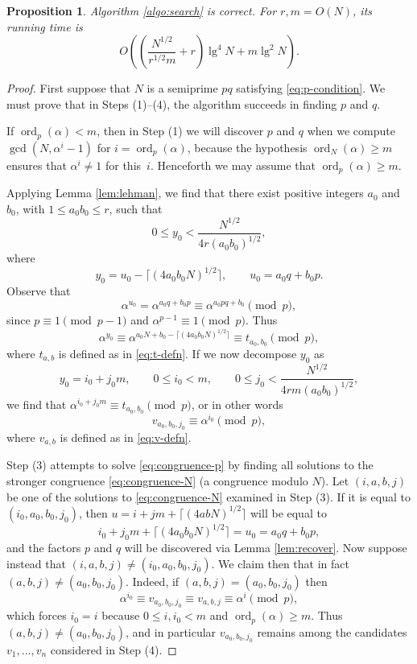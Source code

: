 \documentclass[reqno]{amsart}
\newtheorem{prop}[thm]{Proposition}
\theoremstyle{remark}
\numberwithin{equation}{section}
\numberwithin{thm}{section}
\renewcommand{\leq}{\leqslant}
\renewcommand{\geq}{\geqslant}
\DeclareMathOperator{\ord}{ord}
\begin{document}
\begin{prop}
\label{prop:search}
  Algorithm \ref{algo:search} is correct.
  For $r, m = O(N)$, its running time is
    \[ O\left(\left(\frac{N^{1/2}}{r^{1/2} m} + r\right) \lg^4 N + m \lg^2 N \right). \]
\end{prop}
\begin{proof}
  First suppose that $N$ is a semiprime $pq$ satisfying \eqref{eq:p-condition}.
  We must prove that in Steps (1)--(4),
  the algorithm succeeds in finding $p$ and $q$.

  If $\ord_p(\alpha) < m$,
  then in Step (1) we will discover $p$ and $q$ when we compute
  $\gcd(N, \alpha^i - 1)$ for $i = \ord_p(\alpha)$,
  because the hypothesis $\ord_N(\alpha) \geq m$ ensures that
  $\alpha^i \neq 1$ for this~$i$.
  Henceforth we may assume that $\ord_p(\alpha) \geq m$.

  Applying Lemma \ref{lem:lehman}, we find that there exist positive integers
  $a_0$ and $b_0$, with $1 \leq a_0 b_0 \leq r$, such that
    \[ 0 \leq y_0 < \frac{N^{1/2}}{4r(a_0 b_0)^{1/2}}, \]
  where
    \[ y_0 = u_0 - \lceil (4 a_0 b_0 N)^{1/2} \rceil, \qquad u_0 = a_0 q + b_0 p. \]
  Observe that
    \[ \alpha^{u_0} = \alpha^{a_0 q + b_0 p} \equiv \alpha^{a_0 pq + b_0} \pmod p, \]
  since $p \equiv 1 \pmod{p-1}$ and $\alpha^{p-1} \equiv 1 \pmod p$.
  Thus
    \[ \alpha^{y_0} \equiv \alpha^{a_0 N + b_0 - \lceil (4 a_0 b_0 N)^{1/2} \rceil} \equiv t_{a_0,b_0} \pmod p, \]
  where $t_{a,b}$ is defined as in \eqref{eq:t-defn}.
  If we now decompose $y_0$ as
    \[ y_0 = i_0 + j_0 m, \qquad 0 \leq i_0 < m, \qquad 0 \leq j_0 < \frac{N^{1/2}}{4rm(a_0 b_0)^{1/2}}, \]
  we find that $\alpha^{i_0 + j_0 m} \equiv t_{a_0,b_0} \pmod p$, or in other words
  \begin{equation}
    \label{eq:congruence-p}
    v_{a_0,b_0,j_0} \equiv \alpha^{i_0} \pmod p,
  \end{equation}
  where $v_{a,b}$ is defined as in \eqref{eq:v-defn}.

  Step (3) attempts to solve \eqref{eq:congruence-p} by finding all solutions
  to the stronger congruence \eqref{eq:congruence-N} (a congruence modulo $N$).
  Let $(i,a,b,j)$ be one of the solutions to
  \eqref{eq:congruence-N} examined in Step (3).
  If it is equal to $(i_0,a_0,b_0,j_0)$,
  then $u = i + jm + \lceil (4abN)^{1/2} \rceil$
  will be equal to
    \[ i_0 + j_0 m + \lceil (4 a_0 b_0 N)^{1/2} \rceil = u_0 = a_0 q + b_0 p, \]
  and the factors $p$ and $q$ will be discovered via Lemma \ref{lem:recover}.
  Now suppose instead that $(i,a,b,j) \neq (i_0,a_0,b_0,j_0)$.
  We claim then that in fact $(a,b,j) \neq (a_0,b_0,j_0)$.
  Indeed, if $(a,b,j) = (a_0,b_0,j_0)$ then
    \[ \alpha^{i_0} \equiv v_{a_0,b_0,j_0} \equiv v_{a,b,j} \equiv \alpha^i \pmod p, \]
  which forces $i_0 = i$ because $0 \leq i, i_0 < m$ and $\ord_p(\alpha) \geq m$.
  Thus $(a,b,j) \neq (a_0,b_0,j_0)$,
  and in particular $v_{a_0,b_0,j_0}$ remains among the candidates
  $v_1, \ldots, v_n$ considered in Step (4).


\end{proof}
\end{document}
